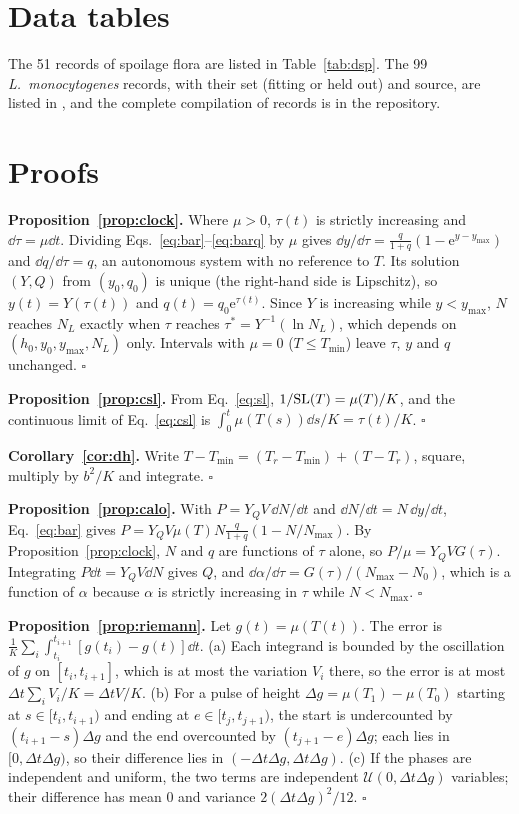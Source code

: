 \appendix
\section{Data tables}\label{app:data}
The 51 records of spoilage flora are listed in Table~\ref{tab:dsp}. The 99 \textit{L.~monocytogenes} records, with their set (fitting or held out) and source, are listed in \ListeriaRef, and the complete compilation of \DatNFull{} records is in the repository.



\section{Proofs}\label{app:proofs}
\textbf{Proposition~\ref{prop:clock}.} Where $\mu>0$, $\tau(t)$ is strictly increasing and $\dd\tau=\mu\dd t$. Dividing Eqs.~\eqref{eq:bar}--\eqref{eq:barq} by $\mu$ gives $\dd y/\dd\tau=\frac{q}{1+q}(1-\mathrm{e}^{y-y_{\max}})$ and $\dd q/\dd\tau=q$, an autonomous system with no reference to $T$. Its solution $(Y,Q)$ from $(y_0,q_0)$ is unique (the right-hand side is Lipschitz), so $y(t)=Y(\tau(t))$ and $q(t)=q_0\mathrm{e}^{\tau(t)}$. Since $Y$ is increasing while $y<y_{\max}$, $N$ reaches $N_L$ exactly when $\tau$ reaches $\tau^*=Y^{-1}(\ln N_L)$, which depends on $(h_0,y_0,y_{\max},N_L)$ only. Intervals with $\mu=0$ ($T\le T_{\min}$) leave $\tau$, $y$ and $q$ unchanged. \hfill$\square$

\textbf{Proposition~\ref{prop:csl}.} From Eq.~\eqref{eq:sl}, $1/\mathrm{SL}(T)=\mu(T)/K$, and the continuous limit of Eq.~\eqref{eq:csl} is $\int_0^t\mu(T(s))\dd s/K=\tau(t)/K$. \hfill$\square$

\textbf{Corollary~\ref{cor:dh}.} Write $T-T_{\min}=(T_r-T_{\min})+(T-T_r)$, square, multiply by $b^2/K$ and integrate. \hfill$\square$

\textbf{Proposition~\ref{prop:calo}.} With $P=Y_QV\,\dd N/\dd t$ and $\dd N/\dd t=N\,\dd y/\dd t$, Eq.~\eqref{eq:bar} gives $P=Y_QV\mu(T)N\frac{q}{1+q}(1-N/N_{\max})$. By Proposition~\ref{prop:clock}, $N$ and $q$ are functions of $\tau$ alone, so $P/\mu=Y_QVG(\tau)$. Integrating $P\dd t=Y_QV\dd N$ gives $Q$, and $\dd\alpha/\dd\tau=G(\tau)/(N_{\max}-N_0)$, which is a function of $\alpha$ because $\alpha$ is strictly increasing in $\tau$ while $N<N_{\max}$. \hfill$\square$

\textbf{Proposition~\ref{prop:riemann}.} Let $g(t)=\mu(T(t))$. The error is $\frac1K\sum_i\int_{t_i}^{t_{i+1}}[g(t_i)-g(t)]\dd t$. (a) Each integrand is bounded by the oscillation of $g$ on $[t_i,t_{i+1}]$, which is at most the variation $V_i$ there, so the error is at most $\Delta t\sum_iV_i/K=\Delta tV/K$. (b) For a pulse of height $\Delta g=\mu(T_1)-\mu(T_0)$ starting at $s\in[t_i,t_{i+1})$ and ending at $e\in[t_j,t_{j+1})$, the start is undercounted by $(t_{i+1}-s)\Delta g$ and the end overcounted by $(t_{j+1}-e)\Delta g$; each lies in $[0,\Delta t\Delta g)$, so their difference lies in $(-\Delta t\Delta g,\Delta t\Delta g)$. (c) If the phases are independent and uniform, the two terms are independent $\mathcal U(0,\Delta t\Delta g)$ variables; their difference has mean 0 and variance $2(\Delta t\Delta g)^2/12$. \hfill$\square$

